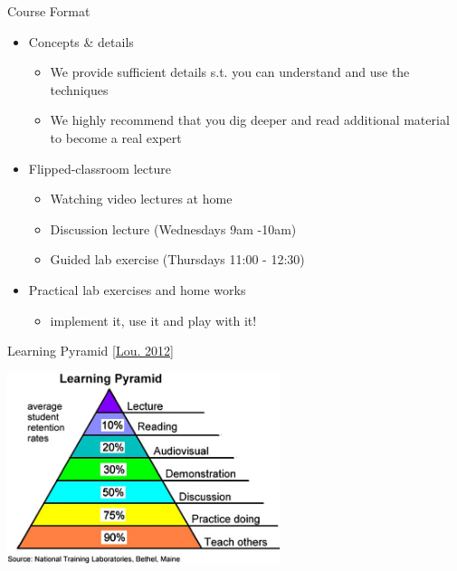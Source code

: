 \documentclass[aspectratio=169]{../latex_main/tntbeamer}  %
\begin{document}
\begin{frame}[c]{Course Format}

\begin{itemize}
	\item Concepts \& details
	\begin{itemize}
	  \item We provide sufficient details s.t. you can understand and use the techniques
	  \item We highly recommend that you dig deeper and read additional material to become a real expert
	\end{itemize}
	\smallskip
	\item Flipped-classroom lecture
	\begin{itemize}
        \item Watching video lectures at home
	  \item Discussion lecture (Wednesdays \alert{9am -10am})
        \item Guided lab exercise (Thursdays 11:00 - 12:30)
	\end{itemize}
	\smallskip
	\item Practical lab exercises and home works
	\begin{itemize}
	  \item implement it, use it and play with it!
	\end{itemize}
\end{itemize}

\end{frame}
\begin{frame}[c]{Learning Pyramid [\href{https://www.researchgate.net/publication/221801860_Applying_principles_from_Scientific_Foundations_for_Future_Physicians_to_teaching_chemistry_in_the_department_of_medicine_at_Chang_Gung_University}{Lou. 2012}]}

\centering
\includegraphics[width=0.6\textwidth]{figures/The-learning-pyramid-from-NTL-Institute-for-Applied-Behavioral-Science.jpg}

\end{frame}
\end{document}
